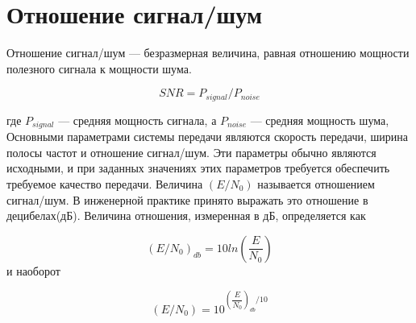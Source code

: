 \section{Отношение сигнал/шум}
Отношение сигнал/шум --- безразмерная величина, равная отношению мощности полезного сигнала к мощности шума.

\[ SNR=P_{signal}/P_{noise} \]

где $P_{signal}$ --- средняя мощность сигнала, а $P_{noise}$ --- средняя мощность шума,
Основными параметрами системы передачи являются скорость передачи, ширина полосы частот и отношение сигнал/шум. Эти параметры обычно являются исходными, и при заданных значениях этих параметров требуется обеспечить требуемое качество передачи.
Величина $(E/N_0)$ называется отношением сигнал/шум.  В инженерной практике принято выражать это отношение в децибелах(дБ).  Величина отношения, измеренная в дБ, определяется как

\[(E/N_0)_{db}=10ln⁡(\dfrac{E}{N_{0}})\]
и наоборот

\[(E/N_0)=10^{(\dfrac{E}{N_{0}})_{db}/10} \]   
